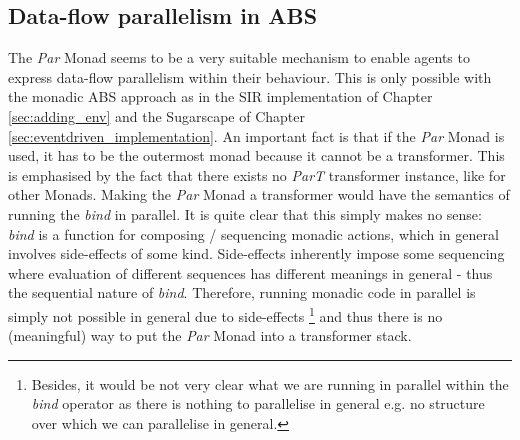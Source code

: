 \subsection{Data-flow parallelism in ABS}
The \textit{Par} Monad seems to be a very suitable mechanism to enable agents to express data-flow parallelism within their behaviour. This is only possible with the monadic ABS approach as in the SIR implementation of Chapter \ref{sec:adding_env} and the Sugarscape of Chapter \ref{sec:eventdriven_implementation}. An important fact is that if the \textit{Par} Monad is used, it has to be the outermost monad because it cannot be a transformer. This is emphasised by the fact that there exists no \textit{ParT} transformer instance, like for other Monads. Making the \textit{Par} Monad a transformer would have the semantics of running the \textit{bind} in parallel. It is quite clear that this simply makes no sense: \textit{bind} is a function for composing / sequencing monadic actions, which in general involves side-effects of some kind. Side-effects inherently impose some sequencing where evaluation of different sequences has different meanings in general - thus the sequential nature of \textit{bind}. Therefore, running monadic code in parallel is simply not possible in general due to side-effects \footnote{Besides, it would be not very clear what we are running in parallel within the \textit{bind} operator as there is nothing to parallelise in general e.g. no structure over which we can parallelise in general.} and thus there is no (meaningful) way to put the \textit{Par} Monad into a transformer stack.